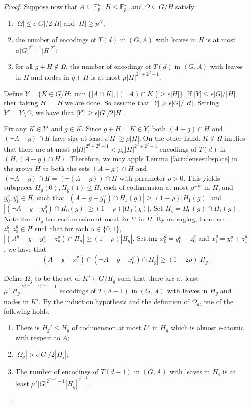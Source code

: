 \documentclass[12pt,oneside,british,a4wide]{amsart}
\numberwithin{equation}{section}
\theoremstyle{definition}
\def\F{\mathbb{F}}
\def\e{\epsilon}
\begin{document}
\begin{proof}
Suppose now that $A\subseteq \F_p^n$, $H\leqslant \F_p^n$, and $\Omega\subseteq G/H$ satisfy 
\begin{enumerate}
\item $|\Omega|\leq \e |G|/2|H|$ and $|H|\geq p^N$;
\item the number of encodings of $T(d)$ in $(G,A)$ with leaves in $H$ is at most $\mu  |G|^{2^{d}-1}|H|^{2^d}$;
\item for all $g+H\notin \Omega$, the number of encodings of $T(d)$ in $(G,A)$ with leaves in $H$ and nodes in $g+H$ is at most $\mu |H|^{2^d+2^d-1}$.
\end{enumerate}
Define $Y=\{K\in G/H: \min\{|A\cap K|, |(\neg A)\cap K|\}\geq \e |H|\}$.  If $|Y|\leq \e |G|/|H|$, then taking $H'=H$ we are done.  So assume that $|Y|> \e |G|/|H|$.   Setting $Y'=Y\setminus \Omega$, we have that $|Y'|\geq \e |G|/2|H|$. 

Fix any $K\in Y'$ and $g\in K$.  Since $g+H=K\in Y$, both $(A-g)\cap H$ and $(\neg A-g)\cap H$ have size at least $\e|H|\geq \rho|H|$.  On the other hand, $K\notin \Omega$ implies that there are at most $\mu|H|^{2^d+2^d-1}<\mu_0|H|^{2^d+2^d-1}$ encodings of $T(d)$ in $(H,(A-g)\cap H)$.  Therefore, we may apply Lemma \ref{fact:densesubspace} in the group $H$ to both the sets $(A-g)\cap H$ and $(\neg A-g)\cap H=(\neg (A-g))\cap H$ with parameter $\rho>0$.  This yields subspaces $H_g(0),H_g(1)\leqslant H$, each of codimension at most $\rho^{-m}$ in $H$, and $y^g_0,y^g_1\in H$, such that $|(A-g-y^g_1)\cap H_1(g)|\geq (1-\rho)|H_1(g)|$ and  $|(\neg A-g-y^g_0)\cap H_0(g)|\geq (1-\rho)|H_0(g)|$.  Set $H_g=H_0(g)\cap H_1(g)$.  Note that $H_g$ has codimension at most $2\rho^{-m}$ in $H$.  By averaging, there are $z^g_1,z^g_0\in H$ such that for each $u\in \{0,1\}$, $|(A^u-g-y^g_u-z^g_u)\cap H_g|\geq (1-\rho)|H_g|$.  Setting $x_0^g=y_0^g+z_0^g$ and $x_1^g=y_1^g+z_1^g$, we have that
\begin{align}\label{align:stableinh1}
|(A-g-x^g_1)\cap (\neg A-g-x^g_0)\cap H_g|\geq (1-2\rho)|H_g|.
\end{align}

Define $\Omega_g$ to be the set of $K'\in G/H_g$ such that  there are at least $\mu'|H_g|^{2^{d-1}+2^{d-1}-1}$ encodings of $T(d-1)$ in $(G,A)$ with leaves in $H_g$ and nodes in $K'$. By the induction hypothesis and the definition of $\Omega_g$, one of the following holds.
\begin{enumerate}
\item[(a)] There is $H_g'\leqslant H_g$ of codimension at most $L'$ in $H_g$ which is almost $\e$-atomic with respect to $A$;
\item[(b)] $|\Omega_g|>\e|G|/2|H_g|$;
\item[(c)] The number of encodings of $T(d-1)$ in $(G,A)$ with leaves in $H_g$ is at least $\mu'|G|^{2^{d-1}-1}|H_g|^{2^{d-1}}$.
\end{enumerate}


\end{proof}
\end{document}
